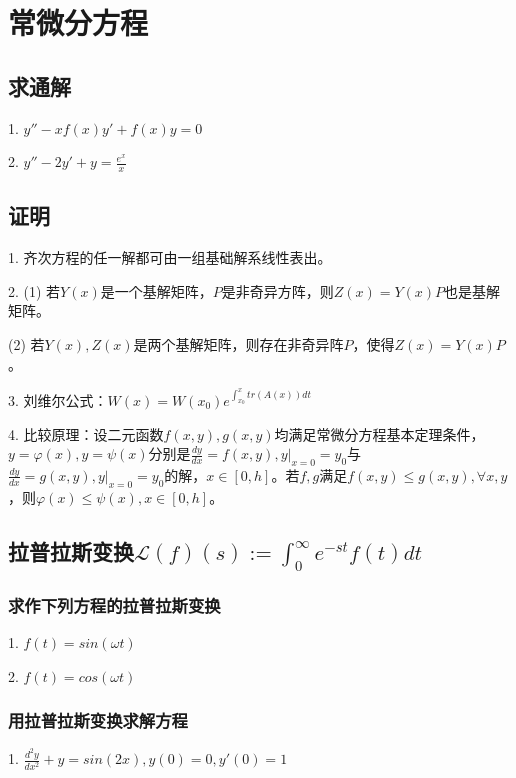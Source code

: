 \documentclass[UTF8,a4paper,12pt]{ctexart}
\begin{document}
\title{}
\author{南京大学数学系\quad 孙永忠 \\\small{\emph{Kuang Yaming Honors School, Nanjing University}}}
\date{\small{2019年7月24日\space 整理}}
\maketitle

\section{常微分方程}
\subsection{求通解}
1. $y''-xf(x)y'+f(x)y=0$

2. $y''-2y'+y=\frac{e^x}{x}$

\subsection{证明}
1. 齐次方程的任一解都可由一组基础解系线性表出。

2. (1) 若$Y(x)$是一个基解矩阵，$P$是非奇异方阵，则$Z(x)=Y(x)P$也是基解矩阵。

\quad\space (2) 若$Y(x),Z(x)$是两个基解矩阵，则存在非奇异阵$P$，使得$Z(x)=Y(x)P$。

3. 刘维尔公式：$W(x)=W(x_0)e^{\int_{x_0}^x tr(A(x))dt}$

4. 比较原理：设二元函数$f(x,y),g(x,y)$均满足常微分方程基本定理条件，$y=\varphi(x),y=\psi(x)$分别是$\frac{dy}{dx}=f(x,y), y\vert_{x=0}=y_0$与$\frac{dy}{dx}=g(x,y), y\vert_{x=0}=y_0$的解，$x\in[0,h]$。若$f,g$满足$f(x,y)\leqslant g(x,y), \forall x,y$，则$\varphi(x)\leqslant \psi(x), x\in[0,h]$。

\subsection{拉普拉斯变换$\mathscr{L}(f)(s):=\int_0^\infty e^{-st}f(t)dt$}
\subsubsection{求作下列方程的拉普拉斯变换}
1. $f(t)=sin(\omega t)$

2. $f(t)=cos(\omega t)$

\subsubsection{用拉普拉斯变换求解方程}
1. $\frac{d^2y}{dx^2}+y=sin(2x), y(0)=0, y'(0)=1$
\end{document}
